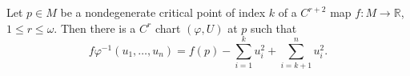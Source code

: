 Let $p \in M$ be a nondegenerate critical point of index $k$ of a $C^{r+2}$ map $f: M \to \mathbb{R}$, $1 \leqslant r \leqslant \omega$. Then there is a $C^r$ chart $(\varphi, U)$ at $p$ such that
$$f\varphi^{-1}(u_1, \ldots, u_n) = f(p) - \sum_{i=1}^{k} u_i^2 + \sum_{i=k+1}^{n} u_i^2.$$
